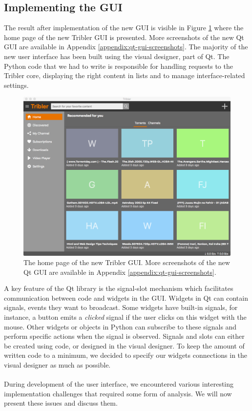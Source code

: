 \subsection{Implementing the GUI}
The result after implementation of the new GUI is visible in Figure \ref{fig:new-gui-1} where the home page of the new Tribler GUI is presented. More screenshots of the new Qt GUI are available in Appendix \ref{appendix:qt-gui-screenshots}. The majority of the new user interface has been built using the visual designer, part of Qt. The Python code that we had to write is responsible for handling requests to the Tribler core, displaying the right content in lists and to manage interface-related settings.\\

\begin{figure}[t]
	\centering
	\includegraphics[width=1.0\columnwidth]{images/improving_qa/newgui1}
	\caption{The home page of the new Tribler GUI. More screenshots of the new Qt GUI are available in Appendix \ref{appendix:qt-gui-screenshots}.}
	\label{fig:new-gui-1}
\end{figure}

\noindent A key feature of the Qt library is the signal-slot mechanism which facilitates communication between code and widgets in the GUI. Widgets in Qt can contain signals, events they want to broadcast. Some widgets have built-in signals, for instance, a button emits a \emph{clicked} signal if the user clicks on this widget with the mouse. Other widgets or objects in Python can subscribe to these signals and perform specific actions when the signal is observed. Signals and slots can either be created using code, or designed in the visual designer. To keep the amount of written code to a minimum, we decided to specify our widgets connections in the visual designer as much as possible.\\\\
During development of the user interface, we encountered various interesting implementation challenges that required some form of analysis. We will now present these issues and discuss them.

